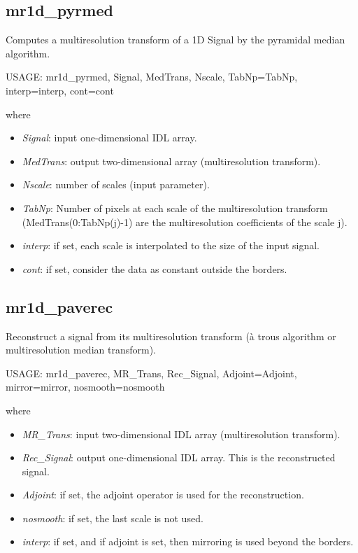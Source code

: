 \subsection{mr1d\_pyrmed}
Computes a multiresolution transform of a 1D Signal by the
pyramidal median algorithm.
{\bf
\begin{center}
     USAGE: mr1d\_pyrmed, Signal, MedTrans, Nscale, TabNp=TabNp, interp=interp, cont=cont
\end{center}}
where 
\begin{itemize}
\item {\em Signal}: input one-dimensional IDL array.
\item {\em MedTrans}: output two-dimensional array (multiresolution transform).
\item {\em Nscale}: number of scales (input parameter).
\item {\em TabNp}: Number of pixels at each scale of the multiresolution
transform (MedTrans(0:TabNp(j)-1) are the multiresolution coefficients
of the scale j).
\item {\em interp}: if set, each scale is interpolated to the size of the 
input signal.
\item {\em cont}: if set, consider the data as constant outside
the borders. 
\end{itemize}
 
\subsection{mr1d\_paverec}
Reconstruct a signal from its multiresolution transform (\`a trous algorithm
or multiresolution median transform).
{\bf
\begin{center}
     USAGE: mr1d\_paverec, MR\_Trans, Rec\_Signal, Adjoint=Adjoint, 
mirror=mirror, nosmooth=nosmooth
\end{center}}
where 
\begin{itemize}
\item {\em MR\_Trans}: input two-dimensional 
IDL array (multiresolution transform).
\item {\em Rec\_Signal}: output one-dimensional 
IDL array. This is the reconstructed signal.
\item {\em Adjoint}: if set, the adjoint operator is used for the 
reconstruction.
\item {\em nosmooth}: if set, the last scale is not used.
\item {\em interp}:  if set, and if adjoint is set, 
then mirroring is used beyond the borders.
\end{itemize}

